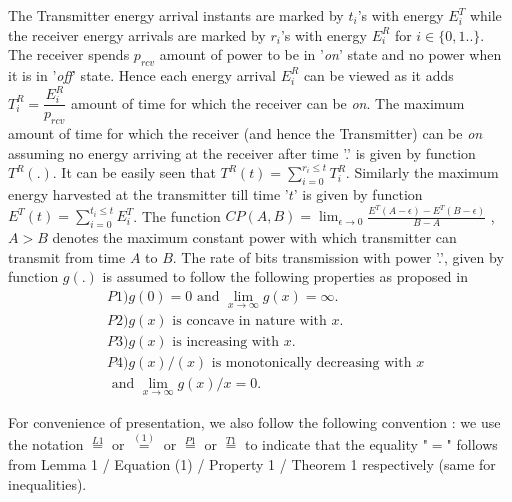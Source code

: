 The Transmitter energy arrival instants are marked by $t_i$'s with energy $E^{T}_i$ while the receiver energy arrivals are marked by $r_i$'s with energy $E^{R}_i$ for $i \in \{0,1..\}$. The receiver spends $p_{rcv}$ amount of power to be in '\textit{on}' state and no power when it is in '\textit{off}' state. Hence each energy arrival $E^{R}_i$ can be viewed as it adds $T^{R}_i=\dfrac{E^{R}_i}{p_{rcv}}$ amount of time for which the receiver can be \textit{on}. The maximum amount of time for which the receiver (and hence the Transmitter) can be \textit{on} assuming no energy arriving at the receiver after time '.' is given by function $T^{R}(.)$. It can be easily seen that $T^{R}(t)=\sum_{i=0}^{r_i\le t}T^{R}_i$. Similarly the maximum energy harvested at the transmitter till time '$t$' is given by function $E^{T}(t)=\sum_{i=0}^{t_i\le t}E^{T}_i$. The function $CP(A,B)=\lim_{\epsilon\rightarrow 0}\frac{E^T(A-\epsilon )-E^T(B-\epsilon )}{B-A}$ , $A>B$ denotes the maximum constant power with which transmitter can transmit from time $A$ to $B$.  The rate of bits transmission with power '.', given by function $g(.)$ is assumed to follow the following properties as proposed in \cite{Yang} 
\begin{align}
&P1) g(0)=0\text{ and }\lim_{x\rightarrow \infty} g(x)= \infty.
\\
&P2) g(x)\text{ is concave in nature with } x.
\\
&P3) g(x)\text{ is increasing with } x.
\\ 
&P4) g(x)/(x) \text{ is monotonically decreasing with } x
\\
&\text{ and } \lim_{x\rightarrow \infty} g(x)/x= 0.
\end{align}

For convenience of presentation, we also follow the following convention : we use the notation $\stackrel{L1}{=}$ or $\stackrel{(1)}{=}$ or $\stackrel{P1}{=}$ or $\stackrel{T1}{=}$ to indicate that the equality "$=$" follows from Lemma 1 / Equation (1) / Property 1 / Theorem 1 respectively (same for inequalities).